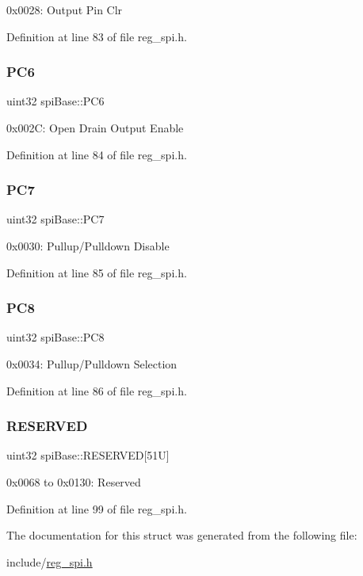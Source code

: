 0x0028\+: Output Pin Clr 

Definition at line 83 of file reg\+\_\+spi.\+h.

\mbox{\label{structspiBase_a69d2b3f0b489e1e1d97230ee5d7d7b85}} 
\subsubsection{\texorpdfstring{P\+C6}{PC6}}
{\footnotesize\ttfamily uint32 spi\+Base\+::\+P\+C6}

0x002C\+: Open Drain Output Enable 

Definition at line 84 of file reg\+\_\+spi.\+h.

\mbox{\label{structspiBase_a0414297155cff5dc698890c298895515}} 
\subsubsection{\texorpdfstring{P\+C7}{PC7}}
{\footnotesize\ttfamily uint32 spi\+Base\+::\+P\+C7}

0x0030\+: Pullup/\+Pulldown Disable 

Definition at line 85 of file reg\+\_\+spi.\+h.

\mbox{\label{structspiBase_a05b2ba057d7d9faadaba337aabae5040}} 
\subsubsection{\texorpdfstring{P\+C8}{PC8}}
{\footnotesize\ttfamily uint32 spi\+Base\+::\+P\+C8}

0x0034\+: Pullup/\+Pulldown Selection 

Definition at line 86 of file reg\+\_\+spi.\+h.

\mbox{\label{structspiBase_aa7777ad73cf8e1d1508fcdce35c39b3e}} 
\subsubsection{\texorpdfstring{R\+E\+S\+E\+R\+V\+ED}{RESERVED}}
{\footnotesize\ttfamily uint32 spi\+Base\+::\+R\+E\+S\+E\+R\+V\+ED\mbox{[}51\+U\mbox{]}}

0x0068 to 0x0130\+: Reserved 

Definition at line 99 of file reg\+\_\+spi.\+h.



The documentation for this struct was generated from the following file\+:\begin{DoxyCompactItemize}
\item 
include/\mbox{\hyperlink{reg__spi_8h}{reg\+\_\+spi.\+h}}\end{DoxyCompactItemize}
